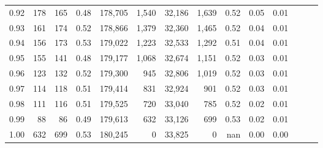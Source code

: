 \begin{tabular}{rrrrrrrrrrrrrr}
0.92 &    178 &  165 &  0.48 &  178,705 &    1,540 &  32,186 &   1,639 &  0.52 &  0.05 &      0.01 \\
0.93 &    161 &  174 &  0.52 &  178,866 &    1,379 &  32,360 &   1,465 &  0.52 &  0.04 &      0.01 \\
0.94 &    156 &  173 &  0.53 &  179,022 &    1,223 &  32,533 &   1,292 &  0.51 &  0.04 &      0.01 \\
0.95 &    155 &  141 &  0.48 &  179,177 &    1,068 &  32,674 &   1,151 &  0.52 &  0.03 &      0.01 \\
0.96 &    123 &  132 &  0.52 &  179,300 &      945 &  32,806 &   1,019 &  0.52 &  0.03 &      0.01 \\
0.97 &    114 &  118 &  0.51 &  179,414 &      831 &  32,924 &     901 &  0.52 &  0.03 &      0.01 \\
0.98 &    111 &  116 &  0.51 &  179,525 &      720 &  33,040 &     785 &  0.52 &  0.02 &      0.01 \\
0.99 &     88 &   86 &  0.49 &  179,613 &      632 &  33,126 &     699 &  0.53 &  0.02 &      0.01 \\
1.00 &    632 &  699 &  0.53 &  180,245 &        0 &  33,825 &       0 &   nan &  0.00 &      0.00 \\
\bottomrule
\end{tabular}
